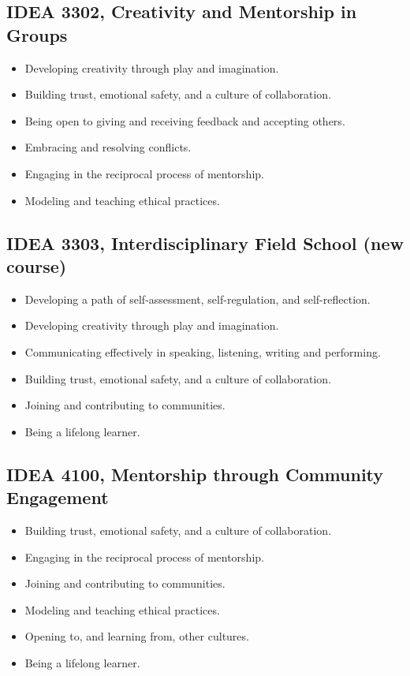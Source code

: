 \documentclass[letterpaper,10pt,headsepline]{scrreprt}
\begin{document}
\subsection{IDEA 3302, Creativity and Mentorship in Groups}

\begin{itemize}
\itemsep1pt\parskip0pt
\item
  Developing creativity through play and imagination.
\item
  Building trust, emotional safety, and a culture of collaboration.
\item
  Being open to giving and receiving feedback and accepting others.
\item
  Embracing and resolving conflicts.
\item
  Engaging in the reciprocal process of mentorship.
\item
  Modeling and teaching ethical practices.
\end{itemize}

\subsection{IDEA 3303, Interdisciplinary Field School (new course)}

\begin{itemize}
\itemsep1pt\parskip0pt
\item
  Developing a path of self-assessment, self-regulation, and
  self-reflection.
\item
  Developing creativity through play and imagination.
\item
  Communicating effectively in speaking, listening, writing and
  performing.
\item
  Building trust, emotional safety, and a culture of collaboration.
\item
  Joining and contributing to communities.
\item
  Being a lifelong learner.
\end{itemize}

\subsection{IDEA 4100, Mentorship through Community Engagement}

\begin{itemize}
\itemsep1pt\parskip0pt
\item
  Building trust, emotional safety, and a culture of collaboration.
\item
  Engaging in the reciprocal process of mentorship.
\item
  Joining and contributing to communities.
\item
  Modeling and teaching ethical practices.
\item
  Opening to, and learning from, other cultures.
\item
  Being a lifelong learner.
\end{itemize}
\end{document}
